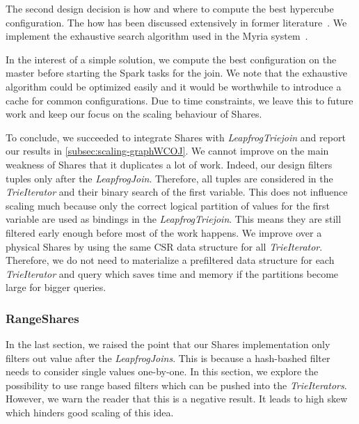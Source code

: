 The second design decision is how and where to compute the best hypercube configuration.
The how has been discussed extensively in former literature~\cite{shares,myria-detailed,shares-proof,shares-skew}.
We implement the exhaustive search algorithm used in the Myria system~\cite{myria-detailed}.

In the interest of a simple solution, we compute the best configuration on the master before starting the Spark
tasks for the join.
We note that the exhaustive algorithm could be optimized easily and it would be worthwhile to introduce
a cache for common configurations.
Due to time constraints, we leave this to future work and keep our focus on the scaling behaviour of Shares.

To conclude, we succeeded to integrate Shares with \textit{LeapfrogTriejoin} and report our results in \cref{subsec:scaling-graphWCOJ}.
We cannot improve on the main weakness of Shares that it duplicates a lot of work.
Indeed, our design filters tuples only after the \textit{LeapfrogJoin}.
Therefore, all tuples are considered in the \textit{TrieIterator} and their binary search of the first variable.
This does not influence scaling much because only the correct logical partition of values for the first variable
are used as bindings in the \textit{LeapfrogTriejoin}.
This means they are still filtered early enough before most of the work happens.
We improve over a physical Shares by using the same CSR data structure for all \textit{TrieIterator}.
Therefore, we do not need to materialize a prefiltered data structure for each \textit{TrieIterator} and query which saves time and memory
if the partitions become large for bigger queries.

\subsubsection{RangeShares} \label{subsubsec:range-shares}
In the last section, we raised the point that our Shares implementation only filters out value after the
\textit{LeapfrogJoins}.
This is because a hash-bashed filter needs to consider single values one-by-one.
In this section, we explore the possibility to use range based filters which can be pushed into the \textit{TrieIterators}.
However, we warn the reader that this is a negative result.
It leads to high skew which hinders good scaling of this idea.

